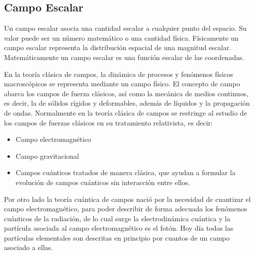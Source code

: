 \documentclass[a4paper,openright,12pt]{book}
\begin{document}
\subsection*{Campo Escalar}
Un campo escalar asocia una cantidad escalar a cualquier punto del espacio. Su valor puede ser un número matemático o una cantidad física. Físicamente un campo escalar representa la distribución espacial de una magnitud escalar. Matemáticamente un campo escalar es una función escalar de las coordenadas.

En la teoría clásica de campos, la dinámica de procesos y fenómenos físicos macroscópicos se representa mediante un campo físico. El concepto de campo abarca los campos de fuerza clásicos, así como la mecánica de medios continuos, es decir, la de sólidos rígidos y deformables, además de líquidos y la propagación de ondas. Normalmente en la teoría clásica de campos se restringe al estudio de los campos de fuerzas clásicos en su tratamiento relativista, es decir: 
\begin{itemize}
\item Campo electromagnético
\item Campo gravitacional
\item Campos cuánticos tratados de manera clásica, que ayudan a formular la evolución de campos cuánticos sin interacción entre ellos.
\end{itemize}

Por otro lado la teoría cuántica de campos nació por la necesidad de cuantizar el campo electromagnético, para poder describir de forma adecuada los fenómenos cuánticos de la radiación, de lo cual surge la electrodinámica cuántica y la partícula asociada al campo electromagnético es el fotón. Hoy día todas las partículas elementales son descritas en principio por cuantos de un campo asociado a ellas.
\end{document}
